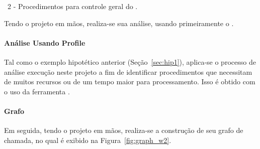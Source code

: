          
         \begin{algorithm}[h]
            
            \BlankLine
            \BlankLine
   
   
            \caption{\Wearable\ 2 - Procedimentos para controle geral do \wearable.}
            \label{alg:wearable2_control}
         \end{algorithm}

         Tendo o projeto em mãos, realiza-se sua análise, usando primeiramente o \profile.
         
   
      \paragraph{Análise Usando Profile}
         Tal como o exemplo hipotético anterior (Seção~\ref{sec:hip1}), aplica-se o processo de análise execução neste projeto a fim de identificar procedimentos que necessitam de muitos recursos ou de um tempo maior para processamento. 
         Isso é obtido com o uso da ferramenta \profile.
      
         
      \paragraph{Grafo}
         Em seguida, tendo o projeto em mãos, realiza-se a construção de seu grafo de chamada, no qual é exibido na Figura~\ref{fig:graph_w2}. 
         

